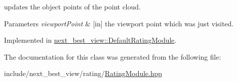 updates the object points of the point cloud. 


\begin{DoxyParams}{\-Parameters}
{\em viewport\-Point} & \mbox{[}in\mbox{]} the viewport point which was just visited. \\
\hline
\end{DoxyParams}


\-Implemented in \hyperlink{classnext__best__view_1_1DefaultRatingModule_a24f23ffbf9df77c40b535405d4dd528b}{next\-\_\-best\-\_\-view\-::\-Default\-Rating\-Module}.



\-The documentation for this class was generated from the following file\-:\begin{DoxyCompactItemize}
\item 
include/next\-\_\-best\-\_\-view/rating/\hyperlink{RatingModule_8hpp}{\-Rating\-Module.\-hpp}\end{DoxyCompactItemize}

